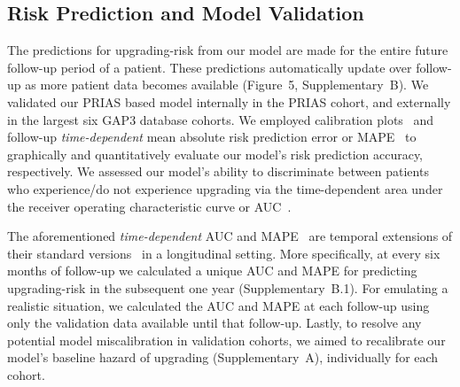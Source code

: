 \subsection{Risk Prediction and Model Validation}
The predictions for upgrading-risk from our model are made for the entire future follow-up period of a patient. These predictions automatically update over follow-up as more patient data becomes available (Figure~5, Supplementary~B). We validated our PRIAS based model internally in the PRIAS cohort, and externally in the largest six GAP3 database cohorts. We employed calibration plots~\citep{royston2013external,steyerberg2010assessing} and follow-up \textit{time-dependent} mean absolute risk prediction error or MAPE~\citep{rizopoulos2017dynamic} to graphically and quantitatively evaluate our model's risk prediction accuracy, respectively. We assessed our model's ability to discriminate between patients who experience/do not experience upgrading via the time-dependent area under the receiver operating characteristic curve or AUC~\citep{rizopoulos2017dynamic}. 

The aforementioned \textit{time-dependent} AUC and MAPE~\citep{rizopoulos2017dynamic} are temporal extensions of their standard versions~\citep{steyerberg2010assessing} in a longitudinal setting. More specifically, at every six months of follow-up we calculated a unique AUC and MAPE for predicting upgrading-risk in the subsequent one year (Supplementary~B.1). For emulating a realistic situation, we calculated the AUC and MAPE at each follow-up using only the validation data available until that follow-up. Lastly, to resolve any potential model miscalibration in validation cohorts, we aimed to recalibrate our model's baseline hazard of upgrading (Supplementary~A), individually for each cohort.